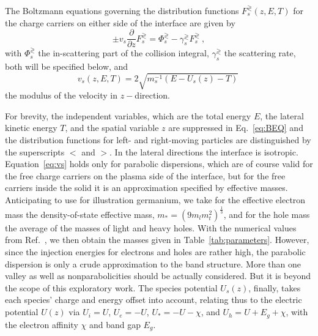 \documentclass[pre,reprint,floats]{revtex4-1}
\begin{document}
The Boltzmann equations governing the distribution functions $F_s^\gtrless(z,E,T)$ for the charge carriers 
on either side of the interface are given by~\cite{RBF20} 
\begin{equation}
\label{eq:BEQ}
	\pm v_s \frac{\partial}{\partial z} F^\gtrless_s = 
	\Phi^\gtrless_s - \gamma^\gtrless_s F^\gtrless_s~,
\end{equation}
with $\Phi^\gtrless_s$ the in-scattering part of the collision integral, $\gamma^\gtrless_s$ the scattering 
rate, both will be specified below, and 
\begin{equation}
	\label{eq:vs}
	v_s(z,E,T) = 2\sqrt{m_s^{-1}(E - U_s(z)-T)}~
\end{equation}
the modulus of the velocity in $z-$direction. 

For brevity, the independent variables, which are the total energy $E$, the lateral kinetic energy 
$T$, and the spatial variable $z$ are suppressed in Eq.~\eqref{eq:BEQ} and the distribution functions 
for left- and right-moving particles are distinguished by the superscripts $<$ and $>$. In the lateral
directions the interface is isotropic. Equation~\eqref{eq:vs} holds only for parabolic dispersions,
which are of course valid for the free charge carriers on the plasma side of the interface, but for 
the free carriers inside the solid it is an approximation specified by effective masses. Anticipating
to use for illustration germanium, we take for the effective electron mass 
the density-of-state effective mass, $m_* = \left(9 m_lm_t^2\right)^{\frac{1}{3}}$, and for the 
hole mass the average of the masses of light and heavy holes. With the numerical values from 
Ref.~\cite{JR83}, we then obtain the masses given in Table~\ref{tab:parameters}. However, since the 
injection energies for electrons and holes are rather high, the parabolic dispersion is only a crude
approximation to the band structure. More than one valley as well as nonparabolicities should be 
actually considered. But it is beyond the scope of this exploratory work. The species potential 
$U_s(z)$, finally, takes each species' charge and energy offset into account, relating thus to the 
electric potential $U(z)$ via $U_i = U$, $U_e  = -U$, $U_* = -U-\chi$, and $U_h = U + E_g + \chi$, 
with the electron affinity $\chi$ and band gap $E_g$.
\end{document}
